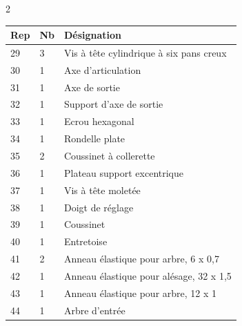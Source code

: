 \begin{multicols}{2}
\begin{marginfigure}
\begin{tabular}{|l|l|l|}
\hline
Rep & Nb  & Désignation \\ \hline \hline %
29&
3&
Vis à tête cylindrique à six pans creux \\ \hline %
30&
1&
Axe d'articulation \\ \hline %
31&
1&
Axe de sortie \\ \hline %
32&
1&
Support d'axe de sortie \\ \hline %
33&
1&
Ecrou hexagonal \\ \hline %
34&
1&
Rondelle plate \\ \hline %
35&
2&
Coussinet à collerette \\ \hline %
36&
1&
Plateau support excentrique \\ \hline %
37&
1&
Vis à tête moletée \\ \hline %
38&
1&
Doigt de réglage \\ \hline %
39&
1&
Coussinet \\ \hline %
40&
1&
Entretoise  \\ \hline 
41&
2&
Anneau élastique pour arbre, 6 x 0,7  \\ \hline %
42&
1&
Anneau élastique pour alésage, 32 x 1,5 \\ \hline %
43&
1&
Anneau élastique pour arbre, 12 x 1 \\ \hline %
44&
1&
Arbre d’entrée \\ \hline %

\end{tabular}
\end{marginfigure}
\end{multicols}

